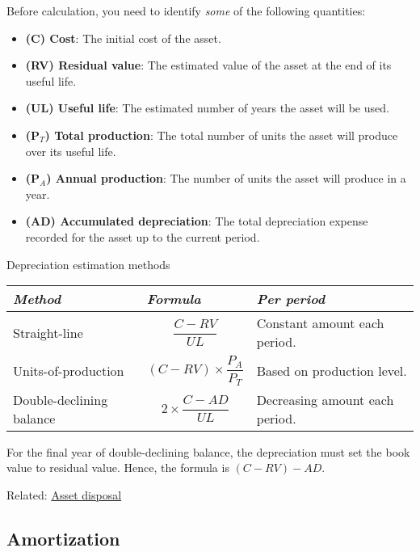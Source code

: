 Before calculation, you need to identify \textit{some} of the following quantities:
\begin{itemize}
    \item \textbf{(C) Cost}: The initial cost of the asset.
    \item \textbf{(RV) Residual value}: The estimated value of the asset at the end of its useful life.
    \item \textbf{(UL) Useful life}: The estimated number of years the asset will be used.
    \item \textbf{(P$_T$) Total production}: The total number of units the asset will produce over its useful life.
    \item \textbf{(P$_A$) Annual production}: The number of units the asset will produce in a year.
    \item \textbf{(AD) Accumulated depreciation}: The total depreciation expense recorded for the asset up to the current period.
\end{itemize}

\begin{theorem}
    {Depreciation estimation methods}
    \begin{tabular}{|p{}|p{}|p{}|}
        \hline
        \textit{Method}          & \textit{Formula}                  & \textit{Per period}            \\
        \hline
        Straight-line            & \[\frac{C - RV}{UL}\]             & Constant amount each period.   \\
        \hline
        Units-of-production      & \[(C - RV)\times\frac{P_A}{P_T}\] & Based on production level.     \\
        \hline
        Double-declining balance & \[2\times\frac{C-AD}{UL}\]        & Decreasing amount each period. \\
        \hline
    \end{tabular}

    For the final year of double-declining balance, the depreciation must set the book value to residual value. Hence, the formula is $(C-RV)- AD$.
\end{theorem}

Related: \hyperref[subsec:asset_disposal]{Asset disposal}

\subsection{Amortization}

